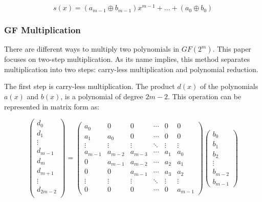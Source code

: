 \begin{equation}
 s(x) = (a_{m-1} \oplus b_{m-1})x^{m-1} + ... + (a_{0} \oplus b_{0})
 \label{eq:4}
\end{equation}


\subsubsection{GF Multiplication} \label{section:gf_mult}

There are different ways to multiply two polynomials in $GF(2^m)$. This paper focuses on two-step multiplication. As its name implies, 
this method separates multiplication into two steps: carry-less multiplication and polynomial reduction.


The first step is carry-less multiplication. The product $d(x)$ of the polynomials $a(x)$ and $b(x)$, is a polynomial of degree $2m-2$. 
This operation can be represented in matrix form as:

\begin{equation}
    \begin{pmatrix}
    d_{0} \\
    d_{1} \\
    \vdots \\
    d_{m-1} \\
    d_{m} \\
    d_{m+1} \\
    \vdots \\
    d_{2m-2} \\
    \end{pmatrix}
    =
    \begin{pmatrix}
        a_{0} & 0 & 0 & \cdots & 0 & 0 \\
        a_{1} & a_{0} & 0 & \cdots & 0 & 0 \\
        \vdots & \vdots & \vdots & \ddots & \vdots & \vdots \\
        a_{m-1} & a_{m-2} & a_{m-3} & \cdots & a_{1} & a_{0} \\
        0 & a_{m-1} & a_{m-2} & \cdots & a_{2} & a_{1} \\
        0 & 0 & a_{m-1} & \cdots & a_{3} & a_{2} \\
        \vdots & \vdots & \vdots & \ddots & \vdots & \vdots \\
        0 & 0 & 0 & \cdots & 0 & a_{m-1} 
    \end{pmatrix}
    \begin{pmatrix}
        b_{0} \\
        b_{1} \\
        b_{2} \\
        \vdots \\
        b_{m-2} \\
        b_{m-1} 
    \end{pmatrix}
\end{equation}

